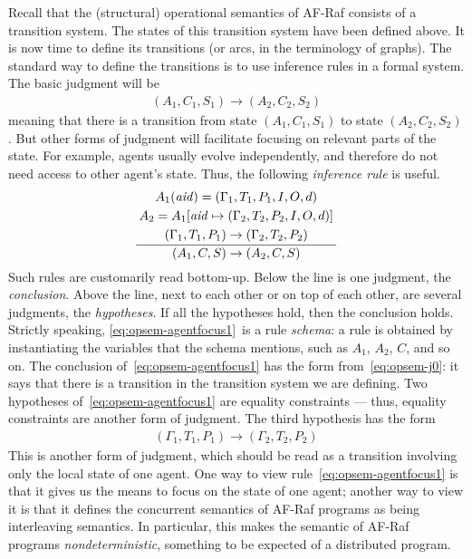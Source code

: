 \documentclass[a4paper,12pt,oneside,fleqn]{book} %
\newcommand{\on}[2]{\genfrac{}{}{0pt}{0}{\strut#1}{\strut#2}}
\begin{document}
Recall that the (structural) operational semantics of AF-Raf consists of a
transition system. The states of this transition system have been defined
above. It is now time to define its transitions (or arcs, in the
terminology of graphs). The standard way to define the transitions is to
use inference rules in a formal system. The basic judgment will be
\begin{align}
(A_1,C_1,S_1) \to (A_2, C_2,S_2)
\label{eq:opsem-j0}
\end{align}
meaning that there is a transition from state $(A_1,C_1,S_1)$ to state
$(A_2,C_2,S_2)$. But other forms of judgment will facilitate focusing on
relevant parts of the state. For example, agents usually evolve
independently, and therefore do not need access to other agent's state.
Thus, the following \emph{inference rule} is useful.
\begin{align}
\frac
  {\on{A_1({\it aid})=(\Gamma_1,T_1,P_1,I,O,d)}
  {\on{A_2=A_1[{\it aid}\mapsto(\Gamma_2,T_2,P_2,I,O,d)]}
  {(\Gamma_1,T_1,P_1)\to(\Gamma_2,T_2,P_2)}}}
  {(A_1,C,S)\to(A_2,C,S)}
\label{eq:opsem-agentfocus1}
\end{align}
Such rules are customarily read bottom-up. Below the line is one judgment,
the \emph{conclusion}. Above the line, next to each other or on top of each
other, are several judgments, the \emph{hypotheses}. If all the hypotheses
hold, then the conclusion holds. Strictly speaking,
\eqref{eq:opsem-agentfocus1}~is a rule \emph{schema}: a rule is obtained by
instantiating the variables that the schema mentions, such as $A_1$, $A_2$,
$C$, and so on. The conclusion of~\eqref{eq:opsem-agentfocus1} has the form
from~\eqref{eq:opsem-j0}: it says that there is a transition in the
transition system we are defining. Two hypotheses
of~\eqref{eq:opsem-agentfocus1} are equality constraints --- thus, equality
constraints are another form of judgment. The third hypothesis has the form
\begin{align}
(\Gamma_1,T_1,P_1)\to(\Gamma_2,T_2,P_2)
\end{align}
This is another form of judgment, which should be read as a transition
involving only the local state of one agent. One way to view
rule~\eqref{eq:opsem-agentfocus1} is that it gives us the means to focus on
the state of one agent; another way to view it is that it defines the
concurrent semantics of AF-Raf programs as being interleaving semantics. In
particular, this makes the semantic of AF-Raf programs
\emph{nondeterministic}, something to be expected of a distributed program.
\end{document}
